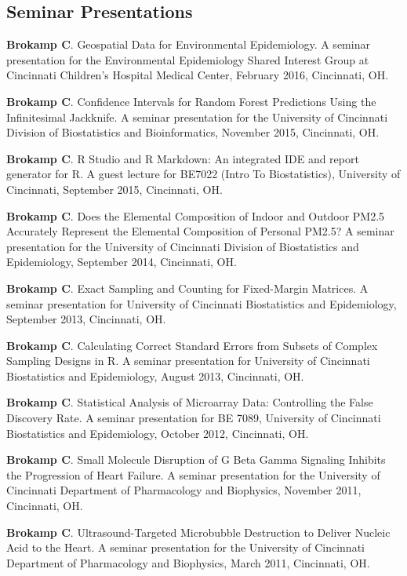 \documentclass[margin,line]{res}
\newenvironment{list3}{
  \begin{list}{}{%
      \setlength{\itemsep}{0in}
      \setlength{\parsep}{0in} \setlength{\parskip}{0in}
      \setlength{\topsep}{0in} \setlength{\partopsep}{0in} 
      \setlength{\leftmargin}{0in}}}{\end{list}}
\begin{document}
\begin{resume}
\section{\sc Seminar Presentations}
\begin{list3} \itemsep 4pt
\item[] \textbf{Brokamp C}. Geospatial Data for Environmental Epidemiology. A seminar presentation for the Environmental Epidemiology Shared Interest Group at Cincinnati Children's Hospital Medical Center, February 2016, Cincinnati, OH.
\item[] \textbf{Brokamp C}. Confidence Intervals for Random Forest Predictions Using the Infinitesimal Jackknife. A seminar presentation for the University of Cincinnati Division of Biostatistics and Bioinformatics, November 2015, Cincinnati, OH.
\item[] \textbf{Brokamp C}. R Studio and R Markdown: An integrated IDE and report generator for R. A guest lecture for BE7022 (Intro To Biostatistics), University of Cincinnati, September 2015, Cincinnati, OH.
\item[] \textbf{Brokamp C}. Does the Elemental Composition of Indoor and Outdoor PM2.5 Accurately Represent the Elemental Composition of Personal PM2.5? A seminar presentation for the University of Cincinnati Division of Biostatistics and Epidemiology, September 2014, Cincinnati, OH. 
\item[] \textbf{Brokamp C}. Exact Sampling and Counting for Fixed-Margin Matrices.  A seminar presentation for University of Cincinnati Biostatistics and Epidemiology, September 2013, Cincinnati, OH.
\item[] \textbf{Brokamp C}. Calculating Correct Standard Errors from Subsets of Complex Sampling Designs in R.  A seminar presentation for University of Cincinnati Biostatistics and Epidemiology, August 2013, Cincinnati, OH.
\item[] \textbf{Brokamp C}. Statistical Analysis of Microarray Data: Controlling the False Discovery Rate.  A seminar presentation for BE 7089, University of Cincinnati Biostatistics and Epidemiology, October 2012, Cincinnati, OH.
\item[] \textbf{Brokamp C}. Small Molecule Disruption of G Beta Gamma Signaling Inhibits the Progression of Heart Failure.  A seminar presentation for the University of Cincinnati Department of Pharmacology and Biophysics, November 2011, Cincinnati, OH.
\item[] \textbf{Brokamp C}. Ultrasound-Targeted Microbubble Destruction to Deliver Nucleic Acid to the Heart.  A seminar presentation for the University of Cincinnati Department of Pharmacology and Biophysics, March 2011, Cincinnati, OH.

\end{list3}
\end{resume}
\end{document}

